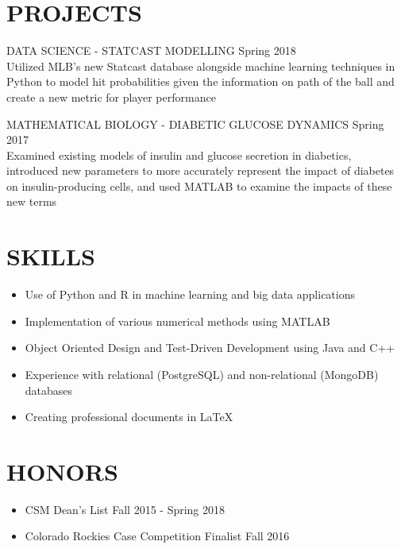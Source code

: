 \documentclass[11pt]{res} %
\begin{document}
\begin{resume}
\vspace{-0.2in}
\hrulefill
\vspace{-0.2in}  
\section{PROJECTS}
\begin{hangparas}{.25in}{1}
DATA SCIENCE - STATCAST MODELLING \hfill Spring 2018 \\ \indent Utilized MLB's new Statcast database alongside machine learning techniques in Python to model hit probabilities given the information on path of the ball and create a new metric for player performance
\vspace{-0.15in}  

MATHEMATICAL BIOLOGY - DIABETIC GLUCOSE DYNAMICS \hfill Spring 2017 \\ Examined existing models of insulin and glucose secretion in diabetics, introduced new parameters to more accurately represent the impact of diabetes on insulin-producing cells, and used MATLAB to examine the impacts of these new terms
\end{hangparas}
\vspace{-0.2in}
\hrulefill
\vspace{-0.2in}  
\section{SKILLS}
 
\begin{itemize} 
	\item Use of Python and R in machine learning and big data applications
	\item Implementation of various numerical methods using MATLAB
	\item Object Oriented Design and Test-Driven Development using Java and C++
 	\item Experience with relational (PostgreSQL) and non-relational (MongoDB) databases
 	\item Creating professional documents in \LaTeX
\end{itemize}
\vspace{-0.2in}
\hrulefill
\vspace{-0.2in}
\section{HONORS} 
 \begin{itemize}
 	\item CSM Dean's List \hfill Fall 2015 - Spring 2018
 	\item Colorado Rockies Case Competition Finalist \hfill Fall 2016
 \end{itemize}

\end{resume}
\end{document}

